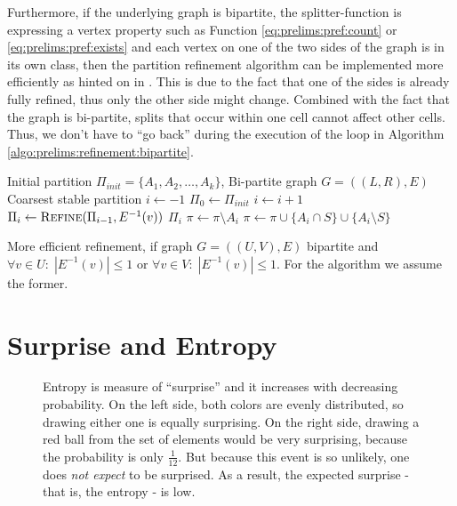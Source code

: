 		Furthermore, if the underlying graph is bipartite, the splitter-function is expressing a vertex property such as Function \ref{eq:prelims:pref:count} or \ref{eq:prelims:pref:exists} and each vertex on one of the two sides of the graph is in its own class, then the partition refinement algorithm can be implemented more efficiently as hinted on in \cite{salvagninDetectingSemanticGroups2016}.
		This is due to the fact that one of the sides is already fully refined, thus only the other side might change. Combined with the fact that the graph is bi-partite, splits that occur within one cell cannot affect other cells.
		Thus, we don't have to \enquote{go back} during the execution of the loop in Algorithm \ref{algo:prelims:refinement:bipartite}.
		
		\begin{algorithm}[ht!]
			\centering
			\begin{algorithmic}
				\Require Initial partition $\Pi_{init} = \{ A_1, A_2, \ldots, A_k \}$, Bi-partite graph $G = ((L, R), E)$
				\Ensure Coarsest stable partition
				\Statex
					\State $i \gets -1$
					\State $\Pi_0 \gets \Pi_{init}$
						\State $i \gets i + 1$
						\State $\Pi_{i} \gets \Call{Refine}{\Pi_{i-1}, E^{-1}(v)}$
					\EndFor
					\State \Return $\Pi_i$
				\EndFunction
				\Statex
						\State $\pi \gets \pi \setminus A_i$
						\State $\pi \gets \pi \cup \{ A_i \cap S \} \cup \{ A_i \setminus S \}$ 
					\EndFor
				\EndFunction
			\end{algorithmic}
			\caption{More efficient refinement, if graph $G=((U, V), E)$ bipartite and $\forall v \in U:\; |E^{-1}(v)| \leq 1$ or $\forall v \in V:\; |E^{-1}(v)| \leq 1$. For the algorithm we assume the former.}
			\label{algo:prelims:refinement:bipartite}
		\end{algorithm}
		
		
	
		\clearpage
	
	\section{Surprise and Entropy}
	
		\begin{figure}[ht!]
			\centering
			
			\caption{Entropy is measure of \enquote{surprise} and it increases with decreasing probability. On the left side, both colors are evenly distributed, so drawing either one is equally surprising. On the right side, drawing a red ball from the set of elements would be very surprising, because the probability is only $\frac{1}{12}$. But because this event is so unlikely, one does \textit{not expect} to be surprised. As a result, the expected surprise - that is, the entropy - is low.}
			\label{figure:prelim:entropy}
		\end{figure}
	
